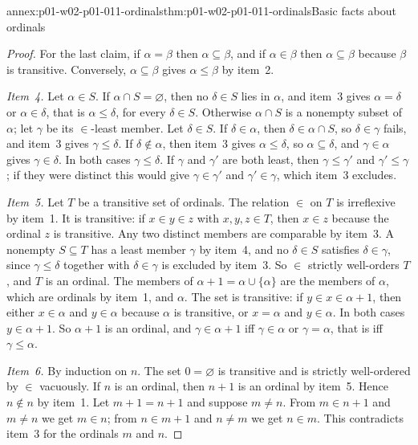 \begin{annexitem}{annex:p01-w02-p01-011-ordinals}{thm:p01-w02-p01-011-ordinals}{Basic facts about ordinals}
\begin{proof}
For the last claim, if \(\alpha=\beta\) then \(\alpha\subseteq\beta\), and if
\(\alpha\in\beta\) then \(\alpha\subseteq\beta\) because \(\beta\) is
transitive. Conversely, \(\alpha\subseteq\beta\) gives \(\alpha\leq\beta\) by
item~2.

\emph{Item~4.} Let \(\alpha\in S\). If \(\alpha\cap S=\varnothing\), then no
\(\delta\in S\) lies in \(\alpha\), and item~3 gives \(\alpha=\delta\) or
\(\alpha\in\delta\), that is \(\alpha\leq\delta\), for every \(\delta\in S\).
Otherwise \(\alpha\cap S\) is a nonempty subset of \(\alpha\); let
\(\gamma\) be its \(\in\)-least member. Let \(\delta\in S\). If
\(\delta\in\alpha\), then \(\delta\in\alpha\cap S\), so \(\delta\in\gamma\)
fails, and item~3 gives \(\gamma\leq\delta\). If \(\delta\notin\alpha\), then
item~3 gives \(\alpha\leq\delta\), so \(\alpha\subseteq\delta\), and
\(\gamma\in\alpha\) gives \(\gamma\in\delta\). In both cases
\(\gamma\leq\delta\). If \(\gamma\) and \(\gamma'\) are both least, then
\(\gamma\leq\gamma'\) and \(\gamma'\leq\gamma\); if they were distinct this
would give \(\gamma\in\gamma'\) and \(\gamma'\in\gamma\), which item~3
excludes.

\emph{Item~5.} Let \(T\) be a transitive set of ordinals. The relation \(\in\)
on \(T\) is irreflexive by item~1. It is transitive: if \(x\in y\in z\) with
\(x,y,z\in T\), then \(x\in z\) because the ordinal \(z\) is transitive. Any
two distinct members are comparable by item~3. A nonempty \(S\subseteq T\)
has a least member \(\gamma\) by item~4, and no \(\delta\in S\) satisfies
\(\delta\in\gamma\), since \(\gamma\leq\delta\) together with
\(\delta\in\gamma\) is excluded by item~3. So \(\in\) strictly well-orders
\(T\), and \(T\) is an ordinal. The members of \(\alpha+1=\alpha\cup\{\alpha\}\)
are the members of \(\alpha\), which are ordinals by item~1, and \(\alpha\).
The set is transitive: if \(y\in x\in\alpha+1\), then either \(x\in\alpha\)
and \(y\in\alpha\) because \(\alpha\) is transitive, or \(x=\alpha\) and
\(y\in\alpha\). In both cases \(y\in\alpha+1\). So \(\alpha+1\) is an
ordinal, and \(\gamma\in\alpha+1\) iff \(\gamma\in\alpha\) or
\(\gamma=\alpha\), that is iff \(\gamma\leq\alpha\).

\emph{Item~6.} By induction on \(n\). The set \(0=\varnothing\) is transitive
and is strictly well-ordered by \(\in\) vacuously. If \(n\) is an ordinal,
then \(n+1\) is an ordinal by item~5. Hence \(n\notin n\) by item~1. Let
\(m+1=n+1\) and suppose \(m\ne n\). From \(m\in n+1\) and \(m\ne n\) we get
\(m\in n\); from \(n\in m+1\) and \(n\ne m\) we get \(n\in m\). This
contradicts item~3 for the ordinals \(m\) and \(n\).
\end{proof}
\end{annexitem}

